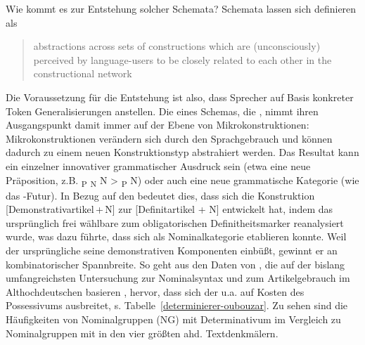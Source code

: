 
Wie kommt es zur Entstehung solcher Schemata? Schemata lassen sich definieren als \blockcquote[14]{Traugott2013}{abstractions across sets of constructions which are (unconsciously) perceived by language-users to be closely related to each other in the constructional network}. Die Voraussetzung für die Entstehung ist also, dass Sprecher auf Basis konkreter Token Generalisierungen anstellen. Die  eines Schemas, die  \parencite[116]{Traugott2013}, nimmt ihren Ausgangspunkt damit immer auf der Ebene von Mikrokonstruktionen: Mikrokonstruktionen verändern sich durch den Sprachgebrauch und können dadurch zu einem neuen Konstruktionstyp abstrahiert werden. Das Resultat kann ein einzelner innovativer grammatischer Ausdruck sein (etwa eine neue Präposition, z.B. \textsubscript{P} \textsubscript{N}  N > \textsubscript{P}  N) oder auch eine neue grammatische Kategorie (wie das -Futur). In Bezug auf den  bedeutet dies, dass sich die Konstruktion   [Demonstrativartikel\,+\,N] zur  [Definitartikel + N] entwickelt hat, indem das ursprünglich frei wählbare  zum obligatorischen Definitheitsmarker  reanalysiert  wurde, 
was dazu führte, dass sich  als Nominalkategorie  etablieren konnte. Weil der ursprüngliche  seine demonstrativen Komponenten einbüßt, gewinnt er an kombinatorischer Spannbreite. So geht aus den Daten von \textcite{Oubouzar1992,Oubouzar1997a}, die auf der bislang umfangreichsten Untersuchung zur Nominalsyntax und zum Artikelgebrauch im Althochdeutschen basieren \parencite{Oubouzar1989}, hervor, dass sich der  u.a. auf Kosten des Possessivums  ausbreitet, s. Tabelle~\ref{determinierer-oubouzar}. Zu sehen sind die Häufigkeiten von Nominalgruppen (NG) mit Determinativum  im Vergleich zu Nominalgruppen mit  in den vier größten ahd. Textdenkmälern. 

